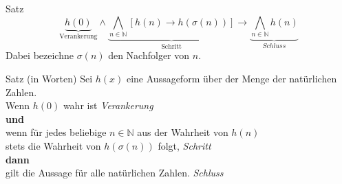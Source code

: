 \documentclass[]{beamer}
\begin{document}
\begin{frame}[squeeze]{}
  \begin{block}{Satz}
    \[\underbrace{h \left( 0 \right)}_{\text{Verankerung}}
      \land
      \underbrace{\bigwedge_{n \in \mathbb{N}} \left[h \left( n \right) \rightarrow h \left( \sigma \left( n \right) \right)\right]}_{\text{Schritt}} 
      \rightarrow 
      \underbrace{\bigwedge_{n \in \mathbb{N}} h \left( n \right)}_{Schluss}\] 
    Dabei bezeichne $\sigma \left( n \right)$ den Nachfolger von $n$.
  \end{block}
  
  \begin{block}{Satz (in Worten)}
    Sei $h \left( x \right)$ eine Aussageform über der Menge der natürlichen Zahlen. \\ 
    \vspace*{1em}
    Wenn $h \left( 0 \right)$ wahr ist \hfill \textit{Verankerung} \\
    \vspace*{0.5em}
    \pause
    \textbf{und} \\
    \vspace*{0.5em}
    wenn für jedes beliebige $n \in \mathbb{N}$ aus der Wahrheit von $h \left( n \right)$ \\ stets die Wahrheit von $h \left( \sigma \left( n \right) \right)$ folgt, \hfill \textit{Schritt} \\
    \vspace*{0.5em}
    \pause
    \textbf{dann} \\
    \vspace*{0.5em}
    gilt die Aussage für alle natürlichen Zahlen. \hfill \textit{Schluss}
  \end{block}
\end{frame}
\end{document}
